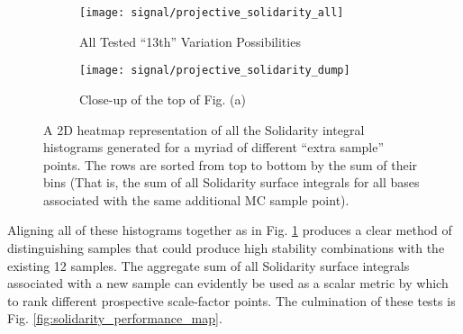     \begin{figure}[tbh]
        \begin{subfigure}{0.5\textwidth}
            \texttt{[image: signal/projective\_solidarity\_all]}
            \captionsetup{justification=centering} \caption{All Tested ``13th'' Variation Possibilities}
        \end{subfigure}
        \begin{subfigure}{0.5\textwidth}
            \texttt{[image: signal/projective\_solidarity\_dump]}
            \captionsetup{justification=centering} \caption{Close-up of the top of Fig. (a)}
        \end{subfigure}
        \caption{
            A 2D heatmap representation of all the Solidarity integral histograms generated for a myriad of different ``extra sample'' points.
            The rows are sorted from top to bottom by the sum of their bins
                (That is, the sum of all Solidarity surface integrals for all bases associated with the same additional MC sample point).
        }
        \label{fig:solidarity_dump}
    \end{figure}

    Aligning all of these histograms together as in Fig. \ref{fig:solidarity_dump}
        produces a clear method of distinguishing samples that 
        could produce high stability combinations with the existing 12 samples.
    The aggregate sum of all Solidarity surface integrals associated with a new sample
        can evidently be used as a scalar metric by which to rank different prospective scale-factor points.
    The culmination of these tests is Fig. \ref{fig:solidarity_performance_map}.

